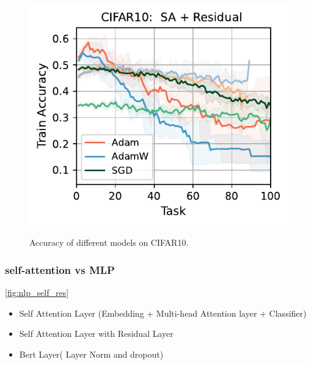\begin{figure}[t]
{        \includegraphics[width=\textwidth]{figs/Accuracy/image/attention_residual/cifar10_40.pdf}
    }
    \caption{Accuracy of different models on CIFAR10.}
    \label{fig:image_models}
\end{figure}



\subsubsection{self-attention vs MLP}

\autoref{fig:nlp_self_res}
\begin{itemize}
    \item Self Attention Layer (Embedding + Multi-head Attention layer + Classifier)
    \item Self Attention Layer  with Residual Layer
    \item Bert Layer( Layer Norm and dropout)
\end{itemize}


